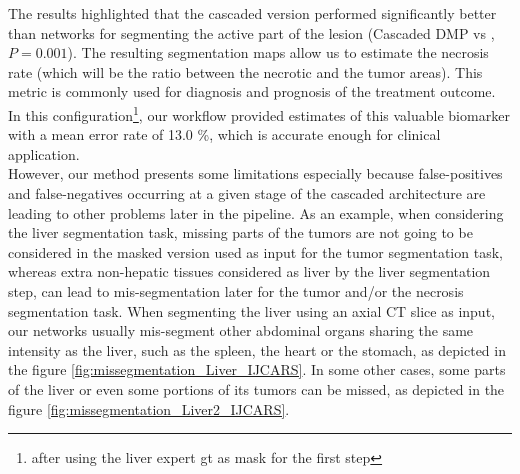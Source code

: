 The results highlighted that the cascaded version performed significantly better than  networks for segmenting the active part of the lesion (Cascaded DMP vs , $P = 0.001$).
The resulting segmentation maps allow us to estimate the necrosis rate (which will be the ratio between the necrotic and the tumor areas). This metric is commonly used for diagnosis and prognosis of the treatment outcome. In this configuration\footnote{after using the liver expert \ac{gt} as mask for the first step}, our workflow provided estimates of this valuable biomarker with a mean error rate of 13.0 \%, which is accurate enough for clinical application. \\

However, our method presents some limitations especially because false-positives and false-negatives occurring at a given stage of the cascaded architecture are leading to other problems later in the pipeline. As an example, when considering the liver segmentation task, missing parts of the tumors are not going to be considered in the masked version used as input for the tumor segmentation task, whereas extra non-hepatic tissues considered as liver by the liver segmentation step, can lead to mis-segmentation later for the tumor and/or the necrosis segmentation task.
When segmenting the liver using an axial CT slice as input, our networks usually mis-segment other abdominal organs sharing the same intensity as the liver, such as the spleen, the heart or the stomach, as depicted in the figure \ref{fig:missegmentation_Liver_IJCARS}.  In some other cases, some parts of the liver or even some portions of its tumors can be missed, as depicted in the figure \ref{fig:missegmentation_Liver2_IJCARS}.
 

